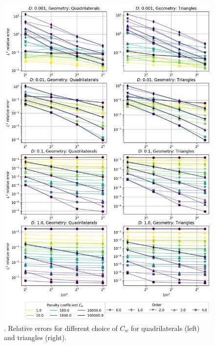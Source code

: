 \begin{figure}[p!]
	\centering
	\includegraphics[height=\textheight]{../figs/parametric/advdiff_2D/quarteroni3.png}
	
	\caption{. Relative errors for different choice of $C_w$ for 
	quadrilaterals (left) and triangles (right).}
	\label{fig:conv_qart3}
\end{figure}